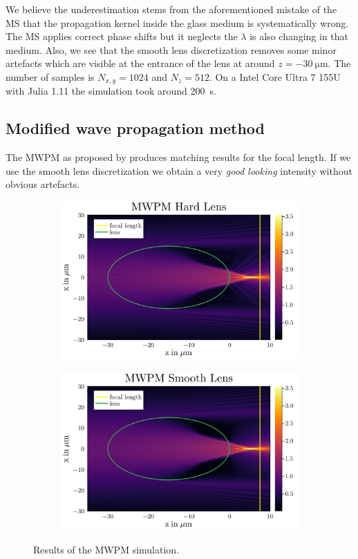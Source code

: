 \documentclass[a4paper,12pt]{article}
\begin{document}
We believe the underestimation stems from the aforementioned mistake of the MS that the propagation kernel inside the glass medium is systematically wrong. The MS applies correct phase shifts but it neglects the $\lambda$ is also changing in that medium.
Also, we see that the smooth lens discretization removes some minor artefacts which are visible at the entrance of the lens at around $z=\SI{-30}{\micro\meter}$.
The number of samples is $N_{x,y} = 1024$ and $N_z=512$. On a Intel Core Ultra 7 155U with Julia 1.11 the simulation took around \SI{200}{\second}.

\subsection{Modified wave propagation method}
The MWPM as proposed by \cite{schmidt2016wave} produces matching results for the focal length. If we use the smooth lens discretization we obtain a very \textit{good looking} intensity without obvious artefacts.
\begin{figure}[H]
    \centering
    \begin{subfigure}[]{0.5\textwidth}
        \centering
        \includegraphics[width=\textwidth]{../figures/MWPM_hard.svg.png} 
    \end{subfigure}%
    \begin{subfigure}[]{0.5\textwidth}
        \centering
        \includegraphics[width=\textwidth]{../figures/MWPM_soft.svg.png} 
    \end{subfigure}
    \caption{Results of the MWPM simulation.}
    \label{fig:}
\end{figure}
\end{document}
